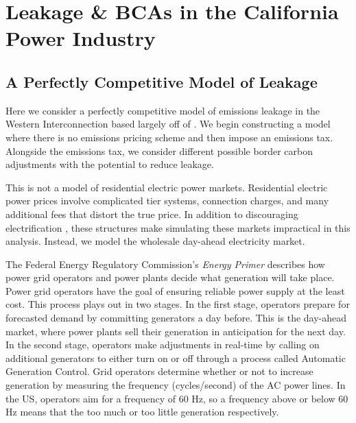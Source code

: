 \newpage
\section{Leakage \& BCAs in the California Power Industry}

\subsection{A Perfectly Competitive Model of Leakage}

Here we consider a perfectly competitive model of emissions leakage in the Western Interconnection based largely off of \cite{fowlie2021border}. We begin constructing a model where there is no emissions pricing scheme and then impose an emissions tax. Alongside the emissions tax, we consider different possible border carbon adjustments with the potential to reduce leakage. 

This is not a model of residential electric power markets. Residential electric power prices involve complicated tier systems, connection charges, and many additional fees that distort the true price. In addition to discouraging electrification \citep[see][]{borenstein2021designing}, these structures make simulating these markets impractical in this analysis. Instead, we model the wholesale day-ahead electricity market. 

The Federal Energy Regulatory Commission's \emph{Energy Primer} \citep{ferc2020} describes how power grid operators and power plants decide what generation will take place. Power grid operators have the goal of ensuring reliable power supply at the least cost. This process plays out in two stages. In the first stage, operators prepare for forecasted demand by committing generators a day before. This is the day-ahead market, where power plants sell their generation in anticipation for the next day. In the second stage, operators make adjustments in real-time by calling on additional generators to either turn on or off through a process called Automatic Generation Control. Grid operators determine whether or not to increase generation by measuring the frequency (cycles/second) of the AC power lines. In the US, operators aim for a frequency of 60 Hz, so a frequency above or below 60 Hz means that the too much or too little generation respectively. 

